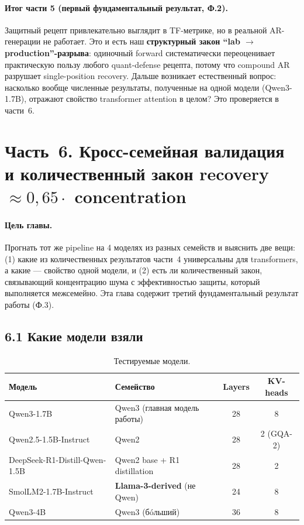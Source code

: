 \documentclass[a4paper,12pt]{article}
\begin{document}
\paragraph{Итог части 5 (первый фундаментальный результат, Ф.2).}
Защитный рецепт привлекательно выглядит в TF-метрике, но в реальной
AR-генерации не работает. Это и есть наш \textbf{структурный закон
``lab $\to$ production''-разрыва}: одиночный forward систематически
переоценивает практическую пользу любого quant-defense рецепта, потому
что compound AR разрушает single-position recovery. Дальше возникает
естественный вопрос: насколько вообще численные результаты, полученные
на одной модели (Qwen3-1.7B), отражают свойство transformer attention в
целом? Это проверяется в части~6.

\clearpage

\section*{Часть~6. Кросс-семейная валидация и количественный закон recovery $\approx 0{,}65 \cdot$ concentration}

\paragraph{Цель главы.} Прогнать тот же pipeline на 4 моделях из разных
семейств и выяснить две вещи: (1) какие из количественных результатов
части~4 универсальны для transformers, а какие --- свойство одной
модели, и (2) есть ли количественный закон, связывающий концентрацию
шума с эффективностью защиты, который выполняется межсемейно. Эта глава
содержит третий фундаментальный результат работы (Ф.3).

\subsection*{6.1 Какие модели взяли}

\begin{table}[H]
\centering
\caption{Тестируемые модели.}
\label{tab:models}
\begin{tabular}{llcc}
\toprule
Модель & Семейство & Layers & KV-heads \\
\midrule
Qwen3-1.7B & Qwen3 (главная модель работы) & 28 & 8 \\
Qwen2.5-1.5B-Instruct & Qwen2 & 28 & 2 (GQA-2) \\
DeepSeek-R1-Distill-Qwen-1.5B & Qwen2 base + R1 distillation & 28 & 2 \\
SmolLM2-1.7B-Instruct & \textbf{Llama-3-derived} (не Qwen) & 24 & 8 \\
Qwen3-4B & Qwen3 (бóльший) & 36 & 8 \\
\bottomrule
\end{tabular}
\end{table}
\end{document}
